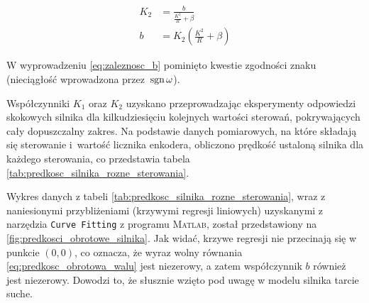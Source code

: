 \begin{align}
    K_2 &= \frac{b}{\frac{K^2}{R} + \beta} \nonumber \\
    b &= K_2 \left(\frac{K^2}{R} + \beta \right) \label{eq:zaleznosc_b}
\end{align}

W wyprowadzeniu \eqref{eq:zaleznosc_b} pominięto kwestie zgodności znaku (nieciągłość wprowadzona przez~$\operatorname{sgn} \omega$).

Współczynniki $K_1$ oraz $K_2$ uzyskano przeprowadzając eksperymenty odpowiedzi skokowych silnika dla kilkudziesięciu kolejnych wartości sterowań, pokrywających cały dopuszczalny zakres. Na podstawie danych pomiarowych, na które składają się sterowanie i~wartość licznika enkodera, obliczono prędkość ustaloną silnika dla każdego sterowania, co przedstawia tabela \ref{tab:predkosc_silnika_rozne_sterowania}.

Wykres danych z tabeli \ref{tab:predkosc_silnika_rozne_sterowania}, wraz z naniesionymi przybliżeniami (krzywymi regresji liniowych) uzyskanymi z narzędzia \texttt{Curve Fitting} z programu \textsc{Matlab}, został przedstawiony na \cref{fig:predkosci_obrotowe_silnika}. Jak widać, krzywe regresji nie przecinają się w punkcie $(0, 0)$, co oznacza, że wyraz wolny równania \eqref{eq:predkosc_obrotowa_walu} jest niezerowy, a zatem współczynnik $b$ również jest niezerowy. Dowodzi to, że słusznie wzięto pod uwagę w modelu silnika tarcie suche.



